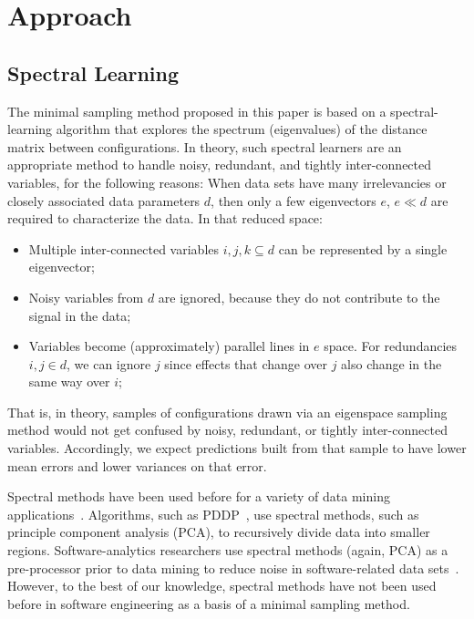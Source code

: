 \documentclass{newsig}
\begin{document}
 \section{Approach}

\subsection{Spectral Learning}\label{sect:spect}

The minimal sampling method proposed in this paper is based on a spectral-learning algorithm
that  explores the spectrum (eigenvalues) of the distance matrix between  configurations.
In theory, such spectral learners are an appropriate method to handle noisy, redundant, and tightly inter-connected variables, for the following reasons:
When data sets have many irrelevancies or closely associated data parameters $d$, then
only a few eigenvectors $e$, $e \ll d$  are required to characterize the data.
In that reduced space:
\begin{itemize}
\item
Multiple inter-connected variables $i,j,k \subseteq d$ can be represented
by a single eigenvector;
\item
Noisy variables from $d$ are
ignored, because they  do not contribute to the signal in the data;
\item
Variables  become (approximately) parallel lines
in $e$ space. For  redundancies \mbox{$i,j \in d$}, we
can ignore $j$
since effects that change over $j$ also
change in the same way over $i$;
\end{itemize}
That is, in theory, samples of configurations drawn via an eigenspace sampling method
would not get confused by noisy, redundant, or tightly inter-connected variables. Accordingly,
we expect predictions built from that sample to have  lower mean errors and lower variances on that error.

Spectral methods have been used before for a variety of data mining applications~\cite{kamvar2003spectral}.
Algorithms, such as PDDP~\cite{boley98}, use spectral methods, such as principle component analysis (PCA), to
recursively divide data into smaller regions.  Software-analytics researchers use spectral methods (again, PCA) as a pre-processor prior to data mining  to reduce noise in software-related data sets~\cite{theisen2015approximating}.
However, to the best of our knowledge, spectral methods have not been used before in software engineering as a basis of a minimal sampling method.
\end{document}
